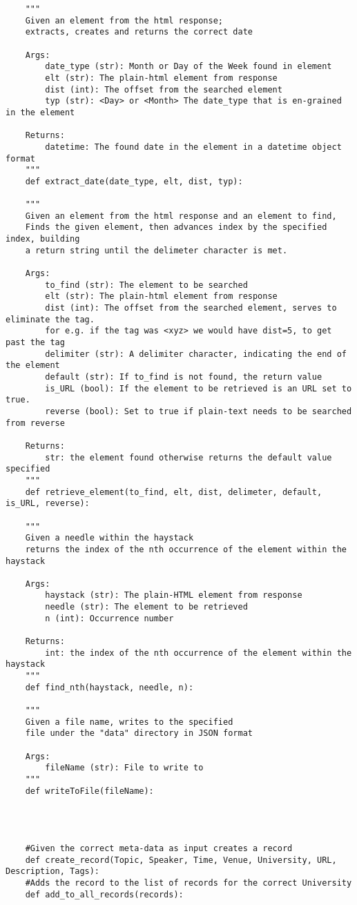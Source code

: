 \documentclass[a4paper,11pt]{article}
\begin{document}
    \begin{verbatim}
    """
    Given an element from the html response; 
    extracts, creates and returns the correct date
    
    Args:
        date_type (str): Month or Day of the Week found in element
        elt (str): The plain-html element from response
        dist (int): The offset from the searched element
        typ (str): <Day> or <Month> The date_type that is en-grained in the element

    Returns:
        datetime: The found date in the element in a datetime object format
    """
    def extract_date(date_type, elt, dist, typ):
    
    """
    Given an element from the html response and an element to find,
    Finds the given element, then advances index by the specified index, building
    a return string until the delimeter character is met. 
    
    Args:
        to_find (str): The element to be searched
        elt (str): The plain-html element from response
        dist (int): The offset from the searched element, serves to eliminate the tag.
        for e.g. if the tag was <xyz> we would have dist=5, to get past the tag
        delimiter (str): A delimiter character, indicating the end of the element
        default (str): If to_find is not found, the return value
        is_URL (bool): If the element to be retrieved is an URL set to true.
        reverse (bool): Set to true if plain-text needs to be searched from reverse
        
    Returns:
        str: the element found otherwise returns the default value specified
    """
    def retrieve_element(to_find, elt, dist, delimeter, default, is_URL, reverse):
    
    """
    Given a needle within the haystack
    returns the index of the nth occurrence of the element within the haystack
    
    Args:
        haystack (str): The plain-HTML element from response
        needle (str): The element to be retrieved
        n (int): Occurrence number

    Returns:
        int: the index of the nth occurrence of the element within the haystack
    """
    def find_nth(haystack, needle, n):

    """
    Given a file name, writes to the specified 
    file under the "data" directory in JSON format
    
    Args:
        fileName (str): File to write to
    """
    def writeToFile(fileName):
    
    
    
    
    #Given the correct meta-data as input creates a record
    def create_record(Topic, Speaker, Time, Venue, University, URL, Description, Tags):
    #Adds the record to the list of records for the correct University
    def add_to_all_records(records):
    
    \end{verbatim}
\end{document}
